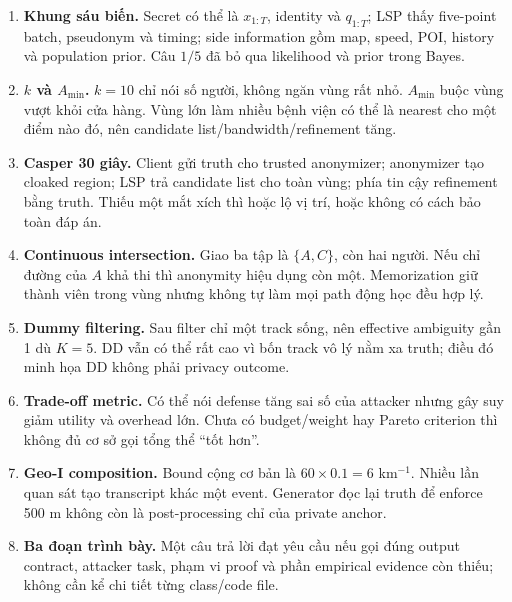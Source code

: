 \documentclass[11pt,a4paper,oneside]{report}
\begin{document}
\begin{enumerate}
  \item \textbf{Khung sáu biến.} Secret có thể là $x_{1:T}$, identity và $q_{1:T}$;
  LSP thấy five-point batch, pseudonym và timing; side information gồm map, speed,
  POI, history và population prior. Câu $1/5$ đã bỏ qua likelihood và prior trong Bayes.

  \item \textbf{$k$ và $A_{\min}$.} $k=10$ chỉ nói số người, không ngăn vùng rất
  nhỏ. $A_{\min}$ buộc vùng vượt khỏi cửa hàng. Vùng lớn làm nhiều bệnh viện có
  thể là nearest cho một điểm nào đó, nên candidate list/bandwidth/refinement tăng.

  \item \textbf{Casper 30 giây.} Client gửi truth cho trusted anonymizer; anonymizer
  tạo cloaked region; LSP trả candidate list cho toàn vùng; phía tin cậy refinement
  bằng truth. Thiếu một mắt xích thì hoặc lộ vị trí, hoặc không có cách bảo toàn đáp án.

  \item \textbf{Continuous intersection.} Giao ba tập là $\{A,C\}$, còn hai người.
  Nếu chỉ đường của $A$ khả thi thì anonymity hiệu dụng còn một. Memorization giữ
  thành viên trong vùng nhưng không tự làm mọi path động học đều hợp lý.

  \item \textbf{Dummy filtering.} Sau filter chỉ một track sống, nên effective
  ambiguity gần 1 dù $K=5$. DD vẫn có thể rất cao vì bốn track vô lý nằm xa truth;
  điều đó minh họa DD không phải privacy outcome.

  \item \textbf{Trade-off metric.} Có thể nói defense tăng sai số của attacker nhưng
  gây suy giảm utility và overhead lớn. Chưa có budget/weight hay Pareto criterion
  thì không đủ cơ sở gọi tổng thể ``tốt hơn''.

  \item \textbf{Geo-I composition.} Bound cộng cơ bản là $60\times0.1=6$
  km$^{-1}$. Nhiều lần quan sát tạo transcript khác một event. Generator đọc lại
  truth để enforce 500 m không còn là post-processing chỉ của private anchor.

  \item \textbf{Ba đoạn trình bày.} Một câu trả lời đạt yêu cầu nếu gọi đúng output
  contract, attacker task, phạm vi proof và phần empirical evidence còn thiếu; không
  cần kể chi tiết từng class/code file.
\end{enumerate}
\end{document}
